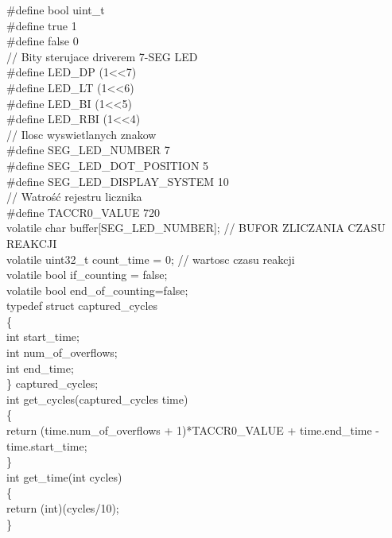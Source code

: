 \documentclass[a4paper,titlepage,11pt,floatssmall]{mwrep}
\begin{document}
\noindent\#define bool  uint\_{}t\\
\#define true 1\\
\#define false 0\\

// Bity sterujace driverem 7-SEG LED\\
\#define LED\_{}DP (1<<7)\\
\#define LED\_{}LT (1<<6)\\
\#define LED\_{}BI (1<<5)\\
\#define LED\_{}RBI (1<<4)\\

// Ilosc wyswietlanych znakow\\
\#define SEG\_{}LED\_{}NUMBER 7\\
\#define SEG\_{}LED\_{}DOT\_{}POSITION 5\\
\#define SEG\_{}LED\_{}DISPLAY\_{}SYSTEM 10\\

// Watrość rejestru licznika\\
\#define TACCR0\_{}VALUE 720\\

\noindent volatile char buffer[SEG\_{}LED\_{}NUMBER]; // BUFOR ZLICZANIA CZASU REAKCJI\\
volatile uint32\_{}t count\_{}time = 0; // wartosc czasu reakcji\\
volatile bool if\_{}counting = false;\\
volatile bool end\_{}of\_{}counting=false;\\


\noindent typedef struct captured\_{}cycles\\
\{\\
    int start\_{}time;\\
    int num\_{}of\_{}overflows;\\
    int end\_{}time;\\
\} captured\_{}cycles;\\

\noindent int get\_{}cycles(captured\_{}cycles time)\\
\{\\
    return (time.num\_{}of\_{}overflows + 1)*TACCR0\_{}VALUE + time.end\_{}time - time.start\_{}time;\\
\}\\

\noindent int get\_{}time(int cycles)\\
\{\\
    return (int)(cycles/10);\\
\}\\
\end{document}
